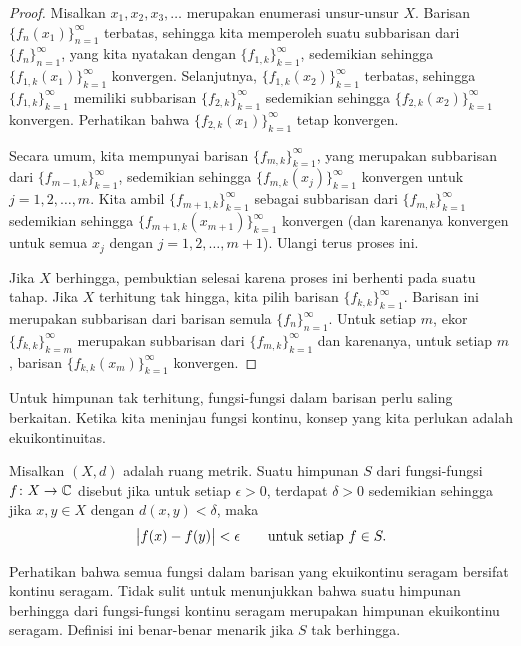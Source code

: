 \begin{proof}
Misalkan $x_1,x_2,x_3,\ldots$ merupakan enumerasi unsur-unsur $X$.
Barisan $\{ f_n(x_1) \}_{n=1}^\infty$ terbatas, sehingga
kita memperoleh suatu subbarisan dari $\{ f_n \}_{n=1}^{\infty}$, yang kita nyatakan dengan
$\{ f_{1,k} \}_{k=1}^\infty$,
sedemikian sehingga
$\{ f_{1,k}(x_1) \}_{k=1}^\infty$ konvergen.
Selanjutnya, $\{ f_{1,k}(x_2) \}_{k=1}^\infty$ terbatas, sehingga
$\{ f_{1,k} \}_{k=1}^\infty$ memiliki subbarisan
$\{ f_{2,k} \}_{k=1}^\infty$ sedemikian sehingga
$\{ f_{2,k}(x_2) \}_{k=1}^\infty$ konvergen.  Perhatikan bahwa
$\{ f_{2,k}(x_1) \}_{k=1}^\infty$ tetap konvergen.

Secara umum, kita mempunyai barisan $\{ f_{m,k} \}_{k=1}^\infty$,
yang merupakan subbarisan dari $\{ f_{m-1,k} \}_{k=1}^\infty$,
sedemikian sehingga $\{ f_{m,k}(x_j) \}_{k=1}^\infty$ konvergen untuk $j=1,2,\ldots, m$.
Kita ambil $\{ f_{m+1,k} \}_{k=1}^\infty$ sebagai subbarisan dari
$\{ f_{m,k} \}_{k=1}^\infty$
sedemikian sehingga
$\{ f_{m+1,k}(x_{m+1}) \}_{k=1}^\infty$ konvergen (dan karenanya konvergen untuk semua
$x_j$ dengan $j=1,2,\ldots,m+1$).  Ulangi terus proses ini.

Jika $X$ berhingga, pembuktian selesai karena proses ini berhenti pada suatu tahap.
Jika $X$ terhitung tak hingga,
kita pilih barisan
$\{ f_{k,k} \}_{k=1}^\infty$.
Barisan ini merupakan subbarisan dari barisan semula $\{ f_n \}_{n=1}^\infty$.
Untuk setiap $m$, ekor $\{ f_{k,k} \}_{k=m}^\infty$ merupakan subbarisan dari
$\{ f_{m,k} \}_{k=1}^\infty$
dan karenanya, untuk setiap $m$, barisan $\{ f_{k,k}(x_m) \}_{k=1}^\infty$ konvergen.
\end{proof}

Untuk himpunan tak terhitung,
fungsi-fungsi dalam barisan perlu saling berkaitan.  Ketika kita meninjau
fungsi kontinu, konsep yang kita perlukan adalah ekuikontinuitas.

\begin{defn}
Misalkan $(X,d)$ adalah ruang metrik.
Suatu himpunan $S$ dari fungsi-fungsi
$f \colon X \to {\mathbb{C}}$ disebut
\emph{}
jika untuk setiap $\epsilon > 0$, terdapat $\delta > 0$
sedemikian sehingga jika $x,y \in X$ dengan $d(x,y) < \delta$, maka
\begin{equation*}
\bigl\lvert {f(x)-f(y)} \bigr\rvert < \epsilon \qquad \text{untuk setiap } f \in S .
\end{equation*}
\end{defn}

Perhatikan bahwa semua fungsi dalam barisan yang ekuikontinu seragam
bersifat kontinu seragam.  Tidak sulit untuk menunjukkan bahwa suatu
himpunan berhingga dari fungsi-fungsi kontinu seragam merupakan himpunan
ekuikontinu seragam.  Definisi ini benar-benar menarik jika $S$ tak berhingga.

